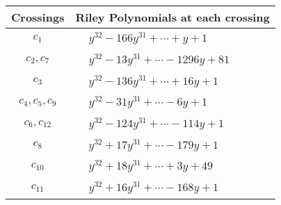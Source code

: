 \documentclass[1p]{elsarticle_modified}
\theoremstyle{definition}
\begin{document}
\begin{tabular}{m{50pt}|m{274pt}}
Crossings & \hspace{64pt}Riley Polynomials at each crossing \\
\hline $$\begin{aligned}c_{1}\end{aligned}$$&$\begin{aligned}
&y^{32}-166 y^{31}+\cdots+y+1
\end{aligned}$\\
\hline $$\begin{aligned}c_{2},c_{7}\end{aligned}$$&$\begin{aligned}
&y^{32}-13 y^{31}+\cdots-1296 y+81
\end{aligned}$\\
\hline $$\begin{aligned}c_{3}\end{aligned}$$&$\begin{aligned}
&y^{32}-136 y^{31}+\cdots+16 y+1
\end{aligned}$\\
\hline $$\begin{aligned}c_{4},c_{5},c_{9}\end{aligned}$$&$\begin{aligned}
&y^{32}-31 y^{31}+\cdots-6 y+1
\end{aligned}$\\
\hline $$\begin{aligned}c_{6},c_{12}\end{aligned}$$&$\begin{aligned}
&y^{32}-124 y^{31}+\cdots-114 y+1
\end{aligned}$\\
\hline $$\begin{aligned}c_{8}\end{aligned}$$&$\begin{aligned}
&y^{32}+17 y^{31}+\cdots-179 y+1
\end{aligned}$\\
\hline $$\begin{aligned}c_{10}\end{aligned}$$&$\begin{aligned}
&y^{32}+18 y^{31}+\cdots+3 y+49
\end{aligned}$\\
\hline $$\begin{aligned}c_{11}\end{aligned}$$&$\begin{aligned}
&y^{32}+16 y^{31}+\cdots-168 y+1
\end{aligned}$\\
\hline
\end{tabular}\\~\\
\end{document}
